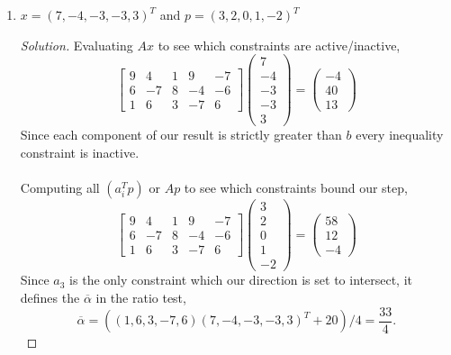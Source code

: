\documentclass[12pt]{article}
\makeatletter
\theoremstyle{homework}
\newenvironment{exercise}[1]
{\def\@currentlabel{#1}\exercisecore}
{\endexercisecore}
\makeatother
\begin{document}
\begin{exercise}{1.3}
\begin{enumerate}
      \item[\textbf{(ii)}] $x = (7, -4, -3, -3, 3)^T$ and $p = (3, 2, 0, 1, -2)^T$
      \begin{proof}[Solution] Evaluating $Ax$ to see which constraints are active/inactive, 
        \begin{equation*}
        \begin{bmatrix}9&4&1&9&-7\\ 6&-7&8&-4&-6\\ 1&6&3&-7&6\end{bmatrix}\begin{pmatrix}7\\ -4\\ -3\\ -3\\ 3\end{pmatrix}=\begin{pmatrix}-4\\ 40\\ 13\end{pmatrix}
      \end{equation*}
        Since each component of our result is strictly greater than $b$ every inequality constraint is inactive.\\\\
        Computing all $(a_i^Tp)$ or $Ap$ to see which constraints bound our step, 
        \begin{equation*}
          \begin{bmatrix}9&4&1&9&-7\\ 6&-7&8&-4&-6\\ 1&6&3&-7&6\end{bmatrix}\begin{pmatrix}3\\ 2\\ 0\\ 1\\ -2\end{pmatrix}=\begin{pmatrix}58\\ 12\\ -4\end{pmatrix}
        \end{equation*}
        Since $a_3$ is the only constraint which our direction is set to intersect, it defines the $\overline{\alpha}$ in the ratio test, 
        \begin{equation*}
          \overline{\alpha} = (( 1 , 6 , 3 , -7 , 6)(7, -4, -3, -3, 3)^T + 20)/4 = \frac{33}{4}.
        \end{equation*}
      \end{proof}
    \vspace{.15in}


\end{enumerate}
\end{exercise}
\end{document}

